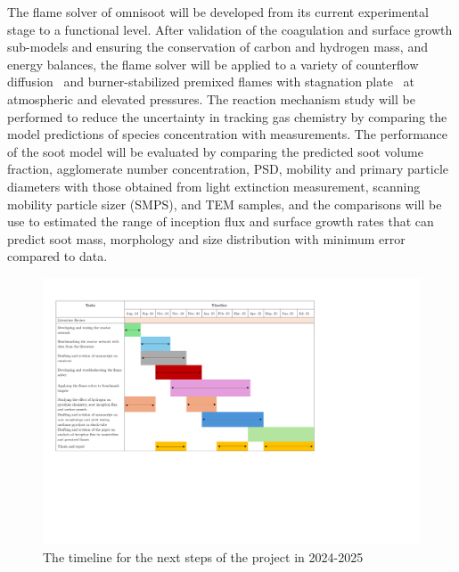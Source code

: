 The flame solver of omnisoot will be developed from its current experimental stage to a functional level. After validation of the coagulation and surface growth sub-models and ensuring the conservation of carbon and hydrogen mass, and energy balances, the flame solver will be applied to a variety of counterflow diffusion~\citep{gleason2021pahs, gleason2023soot} and burner-stabilized premixed flames\citep{abid2009quantitative} with stagnation plate~\citep{camacho2015mobility} at atmospheric and elevated pressures. The reaction mechanism study will be performed to reduce the uncertainty in tracking gas chemistry by comparing the model predictions of species concentration with measurements. The performance of the soot model will be evaluated by comparing the predicted soot volume fraction, agglomerate number concentration, PSD, mobility and primary particle diameters with those obtained from light extinction measurement, scanning mobility particle sizer (SMPS), and TEM samples, and the comparisons will be use to estimated the range of inception flux and surface growth rates that can predict soot mass, morphology and size distribution with minimum error compared to data.


\begin{figure}[!htbp]
	\centering
	\includegraphics[width=1\textwidth]{Figures/Introduction/ganttchart.pdf}
	\caption{The timeline for the next steps of the project in 2024-2025}
	\label{fig:timeline}
\end{figure}



% 





